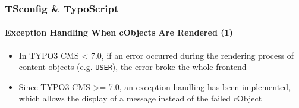 \begin{frame}[fragile]
	\frametitle{TSconfig \& TypoScript}
	\framesubtitle{Exception Handling When cObjects Are Rendered (1)}

	\begin{itemize}
		\item In TYPO3 CMS < 7.0, if an error occurred during the rendering process of content objects (e.g. \texttt{USER}), the error broke the whole frontend
		\item Since TYPO3 CMS >= 7.0, an exception handling has been implemented, which allows the display of a message instead of the failed cObject
	\end{itemize}

%

\end{frame}


